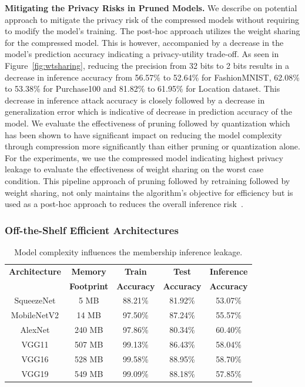 \textbf{Mitigating the Privacy Risks in Pruned Models.} We describe on potential approach to mitigate the privacy risk of the compressed models without requiring to modify the model's training.
The post-hoc approach utilizes the weight sharing for the compressed model. This is however, accompanied by a decrease in the model's prediction accuracy indicating a privacy-utility trade-off.
As seen in Figure~\ref{fig:wtsharing}, reducing the precision from 32 bits to 2 bits results in a decrease in inference accuracy from 56.57\% to 52.64\% for FashionMNIST, 62.08\% to 53.38\% for Purchase100 and 81.82\% to 61.95\% for Location dataset.
This decrease in inference attack accuracy is closely followed by a decrease in generalization error which is indicative of decrease in prediction accuracy of the model.
We evaluate the effectiveness of pruning followed by quantization which has been shown to have significant impact on reducing the model complexity through compression more significantly than either pruning or quantization alone.
For the experiments, we use the compressed model indicating highest privacy leakage to evaluate the effectiveness of weight sharing on the worst case condition.
This pipeline approach of pruning followed by retraining followed by weight sharing, not only maintains the algorithm's objective for efficiency but is used as a post-hoc approach to reduces the overall inference risk~\cite{DBLP:journals/corr/HanMD15,DBLP:journals/corr/HanPNMTECTD16}.






\subsubsection{Off-the-Shelf Efficient Architectures}


\begin{table}[!htb]
\begin{center}
\renewcommand\arraystretch{1.5}
\fontsize{6.7pt}{6.7pt}\selectfont
\begin{tabular}{|c|c|c|c|c|}
\hline
\textbf{Architecture} & \textbf{Memory} & \textbf{Train}  & \textbf{Test}  & \textbf{Inference}   \\
 & \textbf{Footprint} & \textbf{Accuracy} & \textbf{Accuracy} & \textbf{Accuracy}  \\
\hline
SqueezeNet & 5 MB & 88.21\% & 81.92\% & \cellcolor{green!25}53.07\% \\
MobileNetV2 & 14 MB & 97.50\% & 87.24\% & \cellcolor{green!25}55.57\% \\
\hline
AlexNet & 240 MB & 97.86\% & 80.34\% & \cellcolor{red!25}60.40\% \\
VGG11 & 507 MB & 99.13\% & 86.43\% & \cellcolor{red!25}58.04\% \\
VGG16 & 528 MB & 99.58\% & 88.95\% & \cellcolor{red!25}58.70\%  \\
VGG19 & 549 MB & 99.09\% & 88.18\% & \cellcolor{red!25}57.85\% \\
\hline
\end{tabular}
\end{center}
\caption{Model complexity influences the membership inference leakage.}
\label{stdarch}
\end{table}

